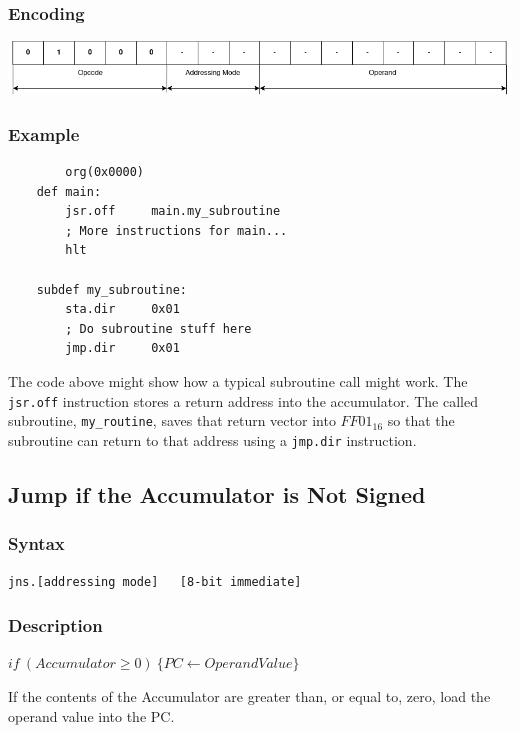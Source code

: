     \subsubsection{Encoding}
    \begin{center}
        \includegraphics[scale=0.40]{img/Andromeda-JSR.drawio}
    \end{center}


\subsubsection{Example}
    \begin{verbatim}
        org(0x0000)
    def main:
        jsr.off     main.my_subroutine
        ; More instructions for main...
        hlt

    subdef my_subroutine:
        sta.dir     0x01
        ; Do subroutine stuff here
        jmp.dir     0x01
    \end{verbatim}
    \par The code above might show how a typical subroutine call might work.
    The \texttt{jsr.off} instruction stores a return address into the accumulator.
    The called subroutine, \texttt{my\_routine}, saves that return vector into $FF01_{16}$
    so that the subroutine can return to that address using a \texttt{jmp.dir} instruction.

\pagebreak
\subsection{Jump if the Accumulator is Not Signed}\label{subsec:jns}
    \subsubsection{Syntax}
    \begin{verbatim}jns.[addressing mode]   [8-bit immediate]\end{verbatim}
    \subsubsection{Description}
    $if\ (Accumulator \geq 0)\ \{ PC \leftarrow OperandValue \}$
    \par If the contents of the Accumulator are greater than, or equal to, zero, load the operand value into the PC\@.
